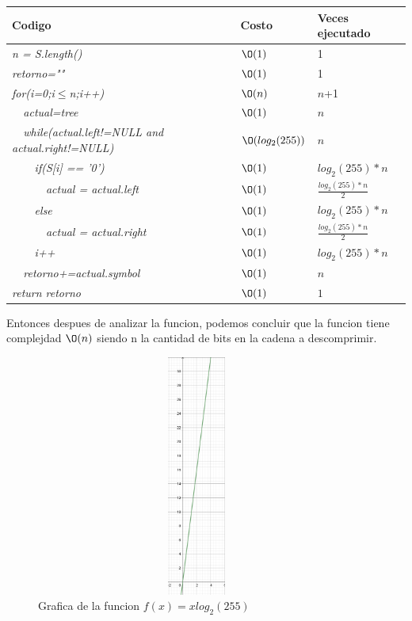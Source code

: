 \documentclass[spanish]{article}
\begin{document}
	\begin{center}
		\begin{table}[H]
			\begin{tabular}{|l|l|l|}
				\hline
				\rowcolor[HTML]{FFCC67} 
				Codigo                           & Costo & Veces ejecutado \\ \hline
				\textit{n = S.length()}                    & $\O(1)$    & 1               \\ \hline
				\textit{retorno=""}                    & $\O(1)$    & 1               \\ \hline
				\textit{for(i=0;i$\leq$n;i++)} & $\O(n)$    & $n$+1             \\ \hline
				\textit{\  \  actual=tree}                 & $\O(1)$    & $n$               \\ \hline
				\textit{\  \  while(actual.left!=NULL and actual.right!=NULL)}                     & $\O(log_2(255))$    & $n$              \\ \hline
				\textit{\  \  \  \  if(S[i] == '0')} & $\O(1)$    & $log_2(255)*n$             \\ \hline
				\textit{\  \  \  \  \  \  actual = actual.left} & $\O(1)$    & $\frac{log_2(255)*n}{2}$             \\ \hline
				\textit{\  \  \  \  else} & $\O(1)$    & $log_2(255)*n$             \\ \hline
				\textit{\  \  \  \  \  \  actual = actual.right} & $\O(1)$    & $\frac{log_2(255)*n}{2}$             \\ \hline
				\textit{\  \  \  \  i++} & $\O(1)$    & $log_2(255)*n$             \\ \hline
				\textit{\  \  retorno+=actual.symbol} & $\O(1)$    & $n$             \\ \hline
				\textit{return retorno} & $\O(1)$    & $1$             \\ \hline				
			\end{tabular}
		\end{table}										
	\end{center}
	Entonces despues de analizar la funcion, podemos concluir que la funcion tiene complejdad $\O(n)$ siendo n la cantidad de bits en la cadena a descomprimir.
	\begin{figure}[H]
		\centering
		\includegraphics[width=400px,height=300px]{grafica12}
		\caption{Grafica de la funcion $f(x) = xlog_2(255)$  }
	\end{figure}
\end{document}

